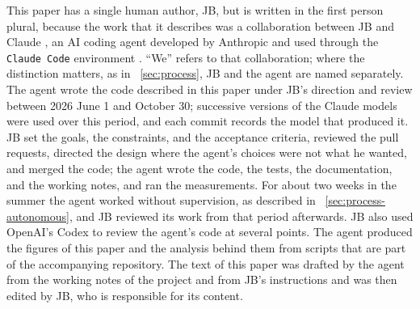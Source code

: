 This paper has a single human author, JB, but is written in the first
person plural, because the work that it describes was a collaboration
between JB and Claude \citep{Anthropic2026Claude}, an AI coding agent
developed by Anthropic and used through the \texttt{Claude Code}
environment \citep{Anthropic2026ClaudeCode}. ``We'' refers to that
collaboration; where the distinction matters, as in
\sectionname~\ref{sec:process}, JB and the agent are named separately.
The agent wrote the code described in this paper under JB's direction
and review between 2026 June 1 and October 30; successive
versions of the Claude models were used over this period, and each
commit records the model that produced it. JB set the goals, the
constraints, and the acceptance criteria, reviewed the pull requests,
directed the design where the agent's choices were not what he wanted,
and merged the code; the agent wrote the code, the tests, the
documentation, and the working notes, and ran the measurements. For
about two weeks in the summer the agent worked without supervision, as
described in \sectionname~\ref{sec:process-autonomous}, and JB reviewed
its work from that period afterwards. JB also used OpenAI's Codex \citep{OpenAI2026Codex} to
review the agent's code at several points. The agent produced the figures
of this paper and the analysis behind them from scripts that are part of
the accompanying repository. The text of this paper was
drafted by the agent from the working notes of the project and from JB's
instructions and was then edited by JB, who is responsible for its
content.
